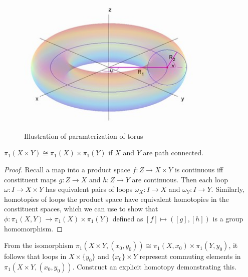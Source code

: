 \documentclass[10pt]{article}
\begin{document}
\begin{figure}[ht!]
\centering
\includegraphics[width=90mm]{torus_parameterization.jpg}
\caption{Illustration of paramterization of torus}
\end{figure}


\begin{theorem}
	$\pi_1(X \times Y) \cong \pi_1(X) \times \pi_1(Y)$ if $X$ and $Y$ are path connected.
\end{theorem}

\begin{proof}
	Recall a map into a product space $f: Z \to X \times Y$ is continuous iff
	constituent maps $g: Z \to X$ and $h: Z \to Y$ are continuous. Then each loop
	$\omega: I \to X \times Y$ has equivalent pairs of loops $\omega_X: I \to X$
	and $\omega_Y: I \to Y$. Similarly, homotopies of loops the product space
	have equivalent homotopies in the constituent spaces, which we can use to
	show that $\phi: \pi_1(X, Y) \to \pi_1(X) \times \pi_1(Y)$ defined as $[f]
	\mapsto ([g], [h])$ is a group homomorphism.
\end{proof}

\begin{exercise}[1.1.10]
	From the isomorphism $\pi_1(X \times Y, (x_0, y_0)) \cong \pi_1(X, x_0) \times
	\pi_1(Y, y_0)$, it follows that loops in $X \times \{y_0\}$ and $\{x_0\}
	\times Y$ represent commuting elements in $\pi_1(X \times Y, (x_0, y_0))$.
	Construct an explicit homotopy demonstrating this.
\end{exercise}
\end{document}
